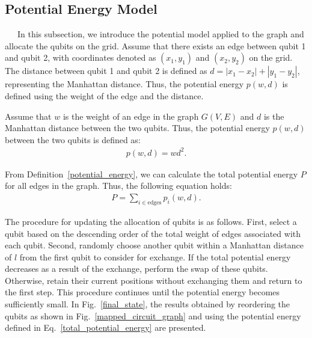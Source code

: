 \documentclass[a4paper,11pt]{ltjsarticle}
\begin{document}
{    \subsection{Potential Energy Model}{
        \ \ \ In this subsection, we introduce the potential model applied to the graph and allocate the qubits on the grid. Assume that there exists an edge between qubit 1 and qubit 2, with coordinates denoted as $(x_1, y_1)$ and $(x_2, y_2)$ on the grid. The distance between qubit 1 and qubit 2 is defined as $d = |x_1 - x_2| + |y_1 - y_2|$, representing the Manhattan distance. Thus, the potential energy $p(w, d)$ is defined using the weight of the edge and the distance.

        \begin{definition}\label{potential_energy}
            Assume that $w$ is the weight of an edge in the graph $G(V, E)$ and $d$ is the Manhattan distance between the two qubits. Thus, the potential energy $p(w, d)$ between the two qubits is defined as:
            \begin{align}
                p(w, d) = wd^2.
            \end{align}
        \end{definition}

        From Definition~\ref{potential_energy}, we can calculate the total potential energy $P$ for all edges in the graph. Thus, the following equation holds:
        \begin{align}\label{total_potential_energy}
            P = \sum_{i\in \text{edges}}p_i(w, d).
        \end{align}

        The procedure for updating the allocation of qubits is as follows. First, select a qubit based on the descending order of the total weight of edges associated with each qubit. Second, randomly choose another qubit within a Manhattan distance of $l$ from the first qubit to consider for exchange. If the total potential energy decreases as a result of the exchange, perform the swap of these qubits. Otherwise, retain their current positions without exchanging them and return to the first step. This procedure continues until the potential energy becomes sufficiently small. In Fig.~\ref{final_state}, the results obtained by reordering the qubits as shown in Fig.~\ref{mapped_circuit_graph} and using the potential energy defined in Eq.~\ref{total_potential_energy} are presented.

}}
\end{document}
